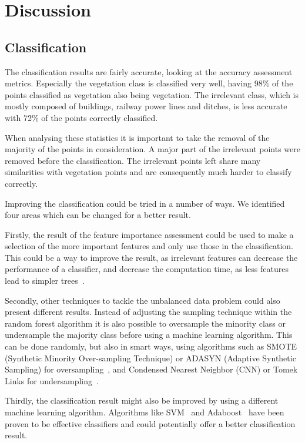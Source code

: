 \section{Discussion}
\subsection{Classification}
The classification results are fairly accurate, looking at the accuracy assessment metrics. Especially the vegetation class is classified very well, having 98\% of the points classified as vegetation also being vegetation. The irrelevant class, which is mostly composed of buildings, railway power lines and ditches, is less accurate with 72\% of the points correctly classified. 

When analysing these statistics it is important to take the removal of the majority of the points in consideration. A major part of the irrelevant points were removed before the classification. The irrelevant points left share many similarities with vegetation points and are consequently much harder to classify correctly.

Improving the classification could be tried in a number of ways. We identified four areas which can be changed for a better result.

Firstly, the result of the feature importance assessment could be used to make a selection of the more important features and only use those in the classification. This could be a way to improve the result, as irrelevant features can decrease the performance of a classifier, and decrease the computation time, as less features lead to simpler trees~\citep{rogers2006identifying}.

Secondly, other techniques to tackle the unbalanced data problem could also present different results. Instead of adjusting the sampling technique within the random forest algorithm it is also possible to oversample the minority class or undersample the majority class before using a machine learning algorithm. This can be done randomly, but also in smart ways, using algorithms such as SMOTE (Synthetic Minority Over-sampling Technique) or ADASYN (Adaptive Synthetic Sampling) for oversampling~\citep{chawla2002smote, he2008adasyn}, and Condensed Nearest Neighbor (CNN) or Tomek Links for undersampling~\citep{hart1968condensed, tomek1976two}.

Thirdly, the classification result might also be improved by using a different machine learning algorithm. Algorithms like SVM~\citep{mallet2008analysis, zhang2013svm, weinmann2015semantic} and Adaboost~\citep{lodha2007aerial, weinmann2015semantic} have been proven to be effective classifiers and could potentially offer a better classification result.

